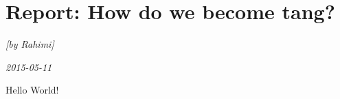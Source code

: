 \documentclass[12pt, pdftex]{article}
\begin{document}
\section*{Report: How do we become tang?}
\noindent
\textsl{[by Rahimi]}

\noindent
\textsl{2015-05-11}

Hello World!
\end{document}
